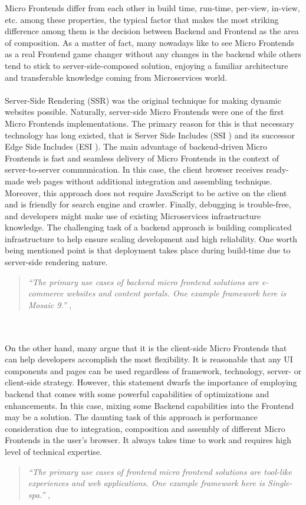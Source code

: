 \documentclass[a4paper]{book}
\begin{document}
Micro Frontends differ from each other in build time, run-time, per-view, in-view, etc. among these properties, the typical factor that makes the most striking difference among them is the decision between Backend and Frontend as the area of composition. As a matter of fact, many nowadays like to see Micro Frontends as a real Frontend game changer without any changes in the backend while others tend to stick to server-side-composed solution, enjoying a familiar architecture and transferable knowledge coming from Microservices world. 
\\ 
\\
Server-Side Rendering (SSR) was the original technique for making dynamic websites possible. Naturally, server-side Micro Frontends were one of the first Micro Frontends implementations. The primary reason for this is that necessary technology has long existed, that is Server Side Includes (SSI \cite{SSI}) and its successor Edge Side Includes (ESI \cite{ESI}). The main advantage of backend-driven Micro Frontends is fast and seamless delivery of Micro Frontends in the context of server-to-server communication. In this case, the client browser receives ready-made web pages without additional integration and assembling technique. Moreover, this approach does not require JavaScript to be active on the client and is friendly for search engine and crawler. Finally, debugging is trouble-free, and developers might make use of existing Microservices infrastructure knowledge. The challenging task of a backend approach is building complicated infrastructure to help ensure scaling development and high reliability. One worth being mentioned point is that deployment takes place during build-time due to server-side rendering nature. \cite{Rap20}
\begin{quote}
    \textit{“The primary use cases of backend micro frontend solutions are e-commerce websites and content portals. One example framework here is Mosaic 9.”} \cite{Zalando}, \cite{Rap20}
\end{quote}
\\ 
\\
On the other hand, many argue that it is the client-side Micro Frontends that can help developers accomplish the most flexibility. It is reasonable that any UI components and pages can be used regardless of framework, technology, server- or client-side strategy. However, this statement dwarfs the importance of employing backend that comes with some powerful capabilities of optimizations and enhancements. In this case, mixing some Backend capabilities into the Frontend may be a solution. The daunting task of this approach is performance consideration due to integration, composition and assembly of different Micro Frontends in the user’s browser. It always takes time to work and requires high level of technical expertise. \cite{Rap20}
\begin{quote}
    \textit{“The primary use cases of frontend micro frontend solutions are tool-like experiences and web applications. One example framework here is Single-spa.”} \cite{SingleSPA}, \cite{Rap20}
\end{quote}
\end{document}
